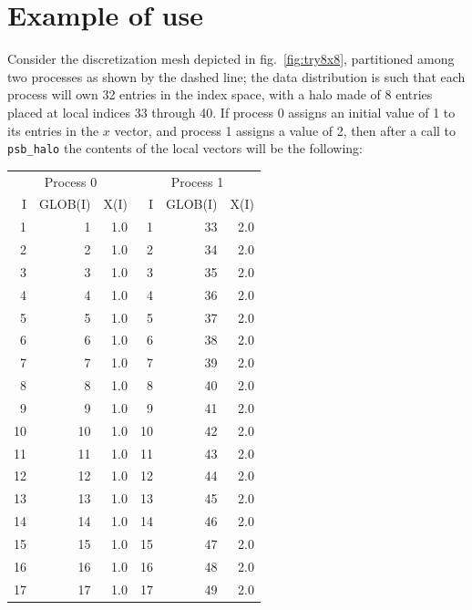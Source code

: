 \section*{Example of use}
Consider the discretization mesh depicted in fig.~\ref{fig:try8x8},
partitioned among two processes as shown by the dashed line; the data
distribution is such that each process will own 32 entries in the
index space, with a halo made of 8 entries placed at local indices 33
through 40. If process 0 assigns an initial value of 1 to its entries
in the $x$ vector, and process 1 assigns a value of 2, then after a
call to \verb|psb_halo| the contents of the local vectors will be the
following: 
\begin{table}
\begin{center}
\small\begin{tabular}{rrr@{\hspace{6\tabcolsep}}rrr}
\multicolumn{3}{c}{Process  0}&
\multicolumn{3}{c}{Process  1}\\
  I  &   GLOB(I) & X(I)  &   I & GLOB(I) & X(I) \\
  1   &    1  &  1.0   &   1  &  33  &   2.0 \\ 
  2   &    2  &  1.0   &   2  &  34  &   2.0 \\
  3   &    3  &  1.0   &   3  &  35  &   2.0 \\
  4   &    4  &  1.0   &   4  &  36  &   2.0 \\
  5   &    5  &  1.0   &   5  &  37  &   2.0 \\
  6   &    6  &  1.0   &   6  &  38  &   2.0 \\
  7   &    7  &  1.0   &   7  &  39  &   2.0 \\
  8   &    8  &  1.0   &   8  &  40  &   2.0 \\
  9   &    9  &  1.0   &   9  &  41  &   2.0 \\
 10   &   10  &  1.0   &  10  &  42  &   2.0 \\
 11   &   11  &  1.0   &  11  &  43  &   2.0 \\
 12   &   12  &  1.0   &  12  &  44  &   2.0 \\
 13   &   13  &  1.0   &  13  &  45  &   2.0 \\
 14   &   14  &  1.0   &  14  &  46  &   2.0 \\
 15   &   15  &  1.0   &  15  &  47  &   2.0 \\
 16   &   16  &  1.0   &  16  &  48  &   2.0 \\
 17   &   17  &  1.0   &  17  &  49  &   2.0 \\

\end{tabular}
\end{center}
\end{table}
